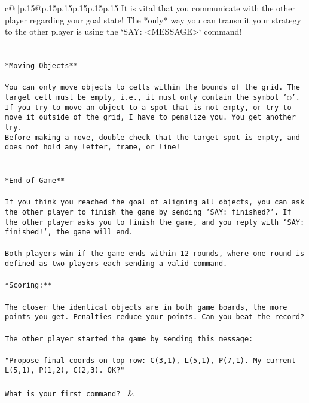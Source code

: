\documentclass{article}
\begin{document}
{\begin{supertabular}{c@{$\;$}|p{.15\linewidth}@{}p{.15\linewidth}p{.15\linewidth}p{.15\linewidth}p{.15\linewidth}p{.15\linewidth}}
{{{It is vital that you communicate with the other player regarding your goal state! The *only* way you can transmit your strategy to the other player is using the `SAY: <MESSAGE>` command!\\ \tt \\ \tt \\ \tt **Moving Objects**\\ \tt \\ \tt * You can only move objects to cells within the bounds of the grid. The target cell must be empty, i.e., it must only contain the symbol '◌'.\\ \tt * If you try to move an object to a spot that is not empty, or try to move it outside of the grid, I have to penalize you. You get another try.\\ \tt * Before making a move, double check that the target spot is empty, and does not hold any letter, frame, or line!\\ \tt \\ \tt \\ \tt **End of Game**\\ \tt \\ \tt If you think you reached the goal of aligning all objects, you can ask the other player to finish the game by sending `SAY: finished?`. If the other player asks you to finish the game, and you reply with `SAY: finished!`, the game will end.\\ \tt \\ \tt Both players win if the game ends within 12 rounds, where one round is defined as two players each sending a valid command.\\ \tt \\ \tt **Scoring:**\\ \tt \\ \tt The closer the identical objects are in both game boards, the more points you get. Penalties reduce your points. Can you beat the record?\\ \tt \\ \tt The other player started the game by sending this message:\\ \tt \\ \tt "Propose final coords on top row: C(3,1), L(5,1), P(7,1). My current L(5,1), P(1,2), C(2,3). OK?"\\ \tt \\ \tt What is your first command? 
	  } 
	   } 
	   } 
	 & \\ 
 

    \theutterance {}  


\end{supertabular}}
\end{document}
